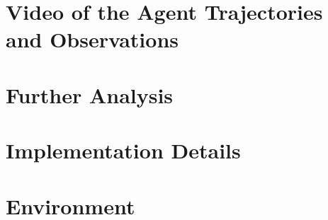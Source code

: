 \documentclass{article}
\begin{document}
\section{Video of the Agent Trajectories and Observations}
\label{supp:video}


\section{Further Analysis}
\label{supp:analysis}


\section{Implementation Details}
\label{supp:implementation}


\section{Environment}
\label{supp:environment}

\end{document}
